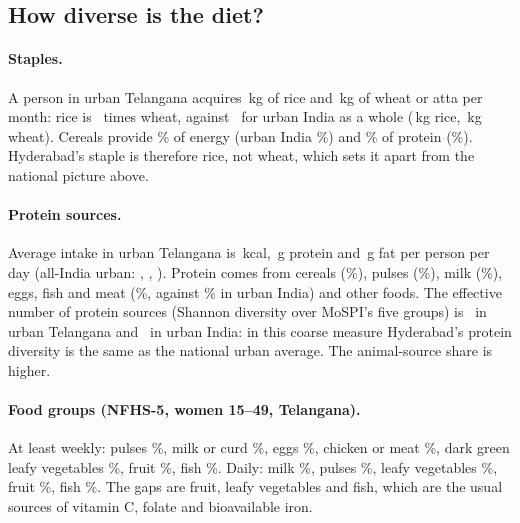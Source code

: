 \subsection{How diverse is the diet?}
\paragraph{Staples.} A person in urban Telangana acquires \hqTgUrbanKgRice\,kg of rice and
\hqTgUrbanKgWheat\,kg of wheat or atta per month: rice is \hqTgUrbanRiceToWheat\ times wheat, against
\hqInUrbanRiceToWheat\ for urban India as a whole (\hqInUrbanKgRice\,kg rice, \hqInUrbanKgWheat\,kg wheat). Cereals
provide \hqKcalCerealTgUrban\% of energy (urban India \hqKcalCerealInUrban\%) and \hqProtCerealTgUrban\% of protein
(\hqProtCerealInUrban\%). Hyderabad's staple is therefore rice, not wheat, which sets it apart from the national
picture above.

\paragraph{Protein sources.} Average intake in urban Telangana is \hqIntakeKcalTgUrban\,kcal,
\hqIntakeProtTgUrban\,g protein and \hqIntakeFatTgUrban\,g fat per person per day (all-India urban:
\hqIntakeKcalInUrban, \hqIntakeProtInUrban, \hqIntakeFatInUrban). Protein comes from cereals
(\hqProtCerealTgUrban\%), pulses (\hqProtPulseTgUrban\%), milk (\hqProtMilkTgUrban\%), eggs, fish and meat
(\hqProtAnimalTgUrban\%, against \hqProtAnimalInUrban\% in urban India) and other foods. The effective number of
protein sources (Shannon diversity over MoSPI's five groups) is \hqProtEffTgUrban\ in urban Telangana and
\hqProtEffInUrban\ in urban India: in this coarse measure Hyderabad's protein diversity is the same as the
national urban average. The animal-source share is higher.

\paragraph{Food groups (NFHS-5, women 15--49, Telangana).} At least weekly: pulses \hqWeeklyPulses\%, milk or curd
\hqWeeklyMilk\%, eggs \hqWeeklyEgg\%, chicken or meat \hqWeeklyMeat\%, dark green leafy vegetables
\hqWeeklyLeafy\%, fruit \hqWeeklyFruit\%, fish \hqWeeklyFish\%. Daily: milk \hqDailyMilk\%, pulses \hqDailyPulses\%,
leafy vegetables \hqDailyLeafy\%, fruit \hqDailyFruit\%, fish \hqDailyFish\%. The gaps are fruit, leafy
vegetables and fish, which are the usual sources of vitamin C, folate and bioavailable iron.


